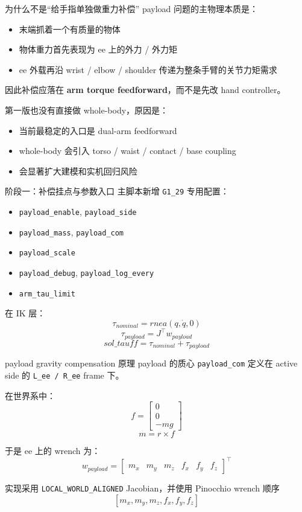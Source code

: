 \documentclass[aspectratio=169,11pt]{ctexbeamer}
\begin{document}
\begin{frame}{为什么不是“给手指单独做重力补偿”}
  payload 问题的主物理本质是：
  \begin{itemize}
    \item 末端抓着一个有质量的物体
    \item 物体重力首先表现为 ee 上的外力 / 外力矩
    \item ee 外载再沿 wrist / elbow / shoulder 传递为整条手臂的关节力矩需求
  \end{itemize}

  \vspace{0.4em}
  因此补偿应落在 \textbf{arm torque feedforward}，而不是先改 hand controller。

  \vspace{0.4em}
  第一版也没有直接做 whole-body，原因是：
  \begin{itemize}
    \item 当前最稳定的入口是 dual-arm feedforward
    \item whole-body 会引入 torso / waist / contact / base coupling
    \item 会显著扩大建模和实机回归风险
  \end{itemize}
\end{frame}

\begin{frame}{阶段一：补偿挂点与参数入口}
  主脚本新增 \texttt{G1\_29} 专用配置：
  \begin{itemize}
    \item \texttt{payload\_enable}, \texttt{payload\_side}
    \item \texttt{payload\_mass}, \texttt{payload\_com}
    \item \texttt{payload\_scale}
    \item \texttt{payload\_debug}, \texttt{payload\_log\_every}
    \item \texttt{arm\_tau\_limit}
  \end{itemize}

  \vspace{0.4em}
  在 IK 层：
  \[
  \tau_{nominal}=rnea(q,\dot q,0)
  \]
  \[
  \tau_{payload}=J^\top w_{payload}
  \]
  \[
  sol\_tauff=\tau_{nominal}+\tau_{payload}
  \]
\end{frame}

\begin{frame}{payload gravity compensation 原理}
  payload 的质心 \texttt{payload\_com} 定义在 active side 的 \texttt{L\_ee / R\_ee} frame 下。

  \vspace{0.4em}
  在世界系中：
  \[
  f=
  \begin{bmatrix}
  0\\0\\-mg
  \end{bmatrix}
  \]
  \[
  m=r\times f
  \]

  于是 ee 上的 wrench 为：
  \[
  w_{payload}=
  \begin{bmatrix}
  m_x&m_y&m_z&f_x&f_y&f_z
  \end{bmatrix}^{\top}
  \]

  实现采用 \texttt{LOCAL\_WORLD\_ALIGNED} Jacobian，并使用 Pinocchio wrench 顺序
  \[
  [m_x,m_y,m_z,f_x,f_y,f_z]
  \]
\end{frame}
\end{document}
